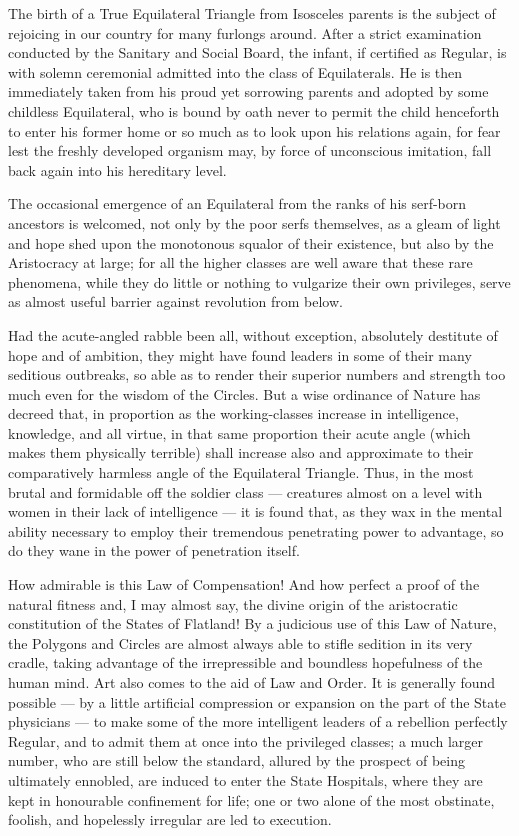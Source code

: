 \documentclass[10pt, kindle, oneside]{kindle}
\begin{document}
The birth of a True Equilateral Triangle from Isosceles parents is the subject
of rejoicing in our country for many furlongs around. After a strict
examination conducted by the Sanitary and Social Board, the infant, if
certified as Regular, is with solemn ceremonial admitted into the class of
Equilaterals. He is then immediately taken from his proud yet sorrowing
parents and adopted by some childless Equilateral, who is bound by oath never
to permit the child henceforth to enter his former home or so much as to look
upon his relations again, for fear lest the freshly developed organism may, by
force of unconscious imitation, fall back again into his hereditary level.

The occasional emergence of an Equilateral from the ranks of his serf-born
ancestors is welcomed, not only by the poor serfs themselves, as a gleam of
light and hope shed upon the monotonous squalor of their existence, but also
by the Aristocracy at large; for all the higher classes are well aware that
these rare phenomena, while they do little or nothing to vulgarize their own
privileges, serve as almost useful barrier against revolution from below.

Had the acute-angled rabble been all, without exception, absolutely destitute
of hope and of ambition, they might have found leaders in some of their many
seditious outbreaks, so able as to render their superior numbers and strength
too much even for the wisdom of the Circles. But a wise ordinance of Nature
has decreed that, in proportion as the working-classes increase in
intelligence, knowledge, and all virtue, in that same proportion their acute
angle (which makes them physically terrible) shall increase also and
approximate to their comparatively harmless angle of the Equilateral Triangle.
Thus, in the most brutal and formidable off the soldier class --- creatures
almost on a level with women in their lack of intelligence --- it is found that,
as they wax in the mental ability necessary to employ their tremendous
penetrating power to advantage, so do they wane in the power of penetration
itself.

How admirable is this Law of Compensation! And how perfect a proof of the
natural fitness and, I may almost say, the divine origin of the aristocratic
constitution of the States of Flatland! By a judicious use of this Law of
Nature, the Polygons and Circles are almost always able to stifle sedition in
its very cradle, taking advantage of the irrepressible and boundless
hopefulness of the human mind. Art also comes to the aid of Law and Order. It
is generally found possible --- by a little artificial compression or expansion
on the part of the State physicians --- to make some of the more intelligent
leaders of a rebellion perfectly Regular, and to admit them at once into the
privileged classes; a much larger number, who are still below the standard,
allured by the prospect of being ultimately ennobled, are induced to enter the
State Hospitals, where they are kept in honourable confinement for life; one
or two alone of the most obstinate, foolish, and hopelessly irregular are led
to execution.
\end{document}
